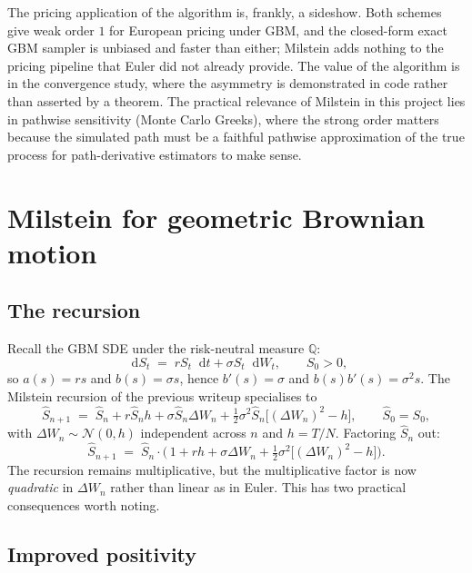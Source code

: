 \documentclass[11pt,a4paper]{article}
\theoremstyle{plain}
\theoremstyle{definition}
\theoremstyle{remark}
\newcommand{\Q}{\mathbb{Q}}
\newcommand{\dd}{\mathop{}\!\mathrm{d}}
\begin{document}
The pricing application of the algorithm is, frankly, a sideshow.
Both schemes give weak order $1$ for European pricing under GBM, and
the closed-form exact GBM sampler is unbiased and faster than
either; Milstein adds nothing to the pricing pipeline that Euler did
not already provide. The value of the algorithm is in the convergence
study, where the asymmetry is demonstrated in code rather than asserted
by a theorem. The practical relevance of Milstein in this project
lies in pathwise sensitivity (Monte Carlo Greeks), where the strong order
matters because the simulated path must be a faithful pathwise
approximation of the true process for path-derivative estimators to
make sense.

\section{Milstein for geometric Brownian motion}
\label{sec:setting}

\subsection{The recursion}

Recall the GBM SDE under the risk-neutral measure $\Q$:
\begin{equation}
\dd S_t \;=\; r S_t \dd t + \sigma S_t \dd W_t,
\qquad S_0 > 0,
\end{equation}
so $a(s) = r s$ and $b(s) = \sigma s$, hence $b'(s) = \sigma$ and
$b(s) b'(s) = \sigma^2 s$. The Milstein recursion of the previous
writeup specialises to
\begin{equation}
\label{eq:milstein-gbm}
\hat S_{n+1} \;=\;
\hat S_n + r \hat S_n h + \sigma \hat S_n \Delta W_n
+ \tfrac{1}{2} \sigma^2 \hat S_n \big[(\Delta W_n)^2 - h\big],
\qquad \hat S_0 = S_0,
\end{equation}
with $\Delta W_n \sim \mathcal{N}(0, h)$ independent across $n$ and
$h = T / N$. Factoring $\hat S_n$ out:
\begin{equation}
\label{eq:milstein-gbm-mult}
\hat S_{n+1} \;=\; \hat S_n \cdot
\Big(\,1 + r h + \sigma \Delta W_n
+ \tfrac{1}{2} \sigma^2 \big[(\Delta W_n)^2 - h\big]\Big).
\end{equation}
The recursion remains multiplicative, but the multiplicative factor
is now \emph{quadratic} in $\Delta W_n$ rather than linear as in
Euler. This has two practical consequences worth noting.

\subsection{Improved positivity}
\end{document}
